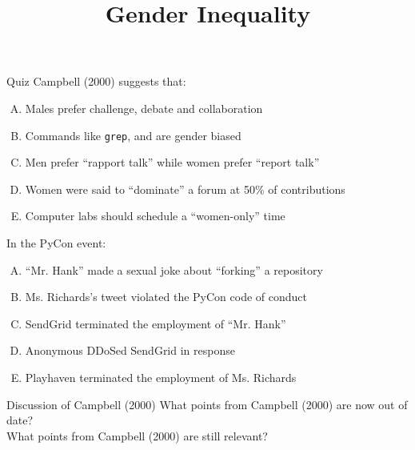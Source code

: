 \documentclass{beamer}
\title{Gender Inequality}
\date{}
\begin{document}
\begin{frame}
\titlepage
\end{frame}

\begin{frame}{Quiz}
Campbell (2000) suggests that:
\begin{enumerate}[(A)]
\item<1> Males prefer challenge, debate and collaboration %
\item<1> Commands like \texttt{grep},  and  are gender biased %
\item<1> Men prefer ``rapport talk'' while women prefer ``report talk'' %
\item<1> Women were said to ``dominate'' a forum at 50\% of contributions %
\item<1-2> Computer labs should schedule a ``women-only'' time
\end{enumerate}
\bigskip
In the PyCon event:
\begin{enumerate}[(A)]
\item<1> ``Mr. Hank'' made a sexual joke about ``forking'' a repository %
\item<1> Ms. Richards's tweet violated the PyCon code of conduct %
\item<1> SendGrid terminated the employment of ``Mr. Hank'' %
\item<1-2> Anonymous DDoSed SendGrid in response
\item<1> Playhaven terminated the employment of Ms. Richards %
\end{enumerate}
\end{frame}

\begin{frame}{Discussion of Campbell (2000)}
What points from Campbell (2000) are now out of date?\\[5em]
What points from Campbell (2000) are still relevant?
\end{frame}
\end{document}
